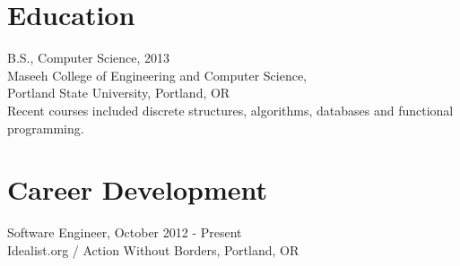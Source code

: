\documentclass{res} %
\begin{document}
\address{9128 SE Harrison St\\
         Portland OR 97216\\
         (503) 703-5611\\
         carrbens@gmail.com\\
         github.com/carrbs}

\begin{resume}


\section{Education}
B.S., Computer Science, 2013\\
Maseeh College of Engineering and Computer Science, \\
Portland State University, Portland, OR \\
Recent courses included discrete structures, algorithms, databases and functional programming.

%

\section{Career Development} \vspace{.05in}

Software Engineer, October 2012 - Present\\
Idealist.org / Action Without Borders, Portland, OR


\end{resume}
\end{document}

